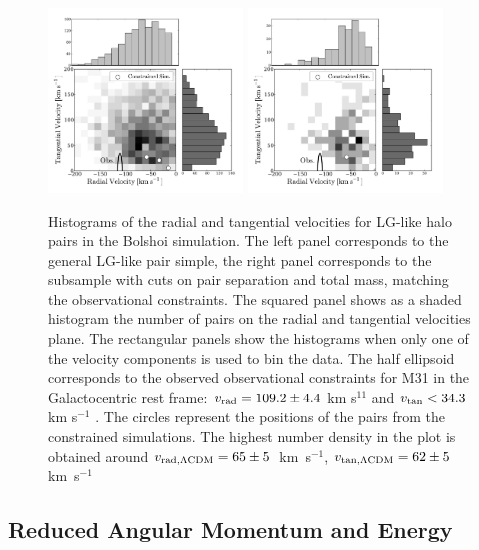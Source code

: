 \documentclass{emulateapj}
\newcommand{\kms}{\,km~s$^{-1}$}
\begin{document}
\begin{figure}
\begin{center}
\includegraphics[keepaspectratio=true,width=0.46\textwidth]{./figures/test_rt.pdf}
\includegraphics[keepaspectratio=true,width=0.46\textwidth]{./figures/test_rt_narrow.pdf}
\caption{Histograms of the radial and tangential velocities for LG-like halo pairs in the Bolshoi simulation. The left panel corresponds to the general LG-like pair simple, the right panel corresponds to the subsample with cuts on pair separation and total mass, matching the observational constraints. The squared panel shows as a shaded histogram the number of pairs on the radial and tangential velocities plane. The rectangular panels show the histograms when only one of the velocity components is used to bin the data. The half ellipsoid corresponds to the observed observational constraints for M31 in the Galactocentric rest frame: $v_{\rm rad}=109.2\pm 4.4$ km s$^{11}$ and $v_{\rm tan}< 34.3$ km s$^{-1}$ \citep{vanderMarel12}. The circles represent the positions of the pairs from the constrained simulations. The highest number density in the plot is obtained around $v_{\rm rad,\Lambda CDM} = 65\pm5$ \kms, $v_{\rm tan,\Lambda CDM} = 62\pm5$ \kms}
\label{fig:rt}
\end{center}

\end{figure}

\subsection{Reduced Angular Momentum and Energy}
\end{document}
